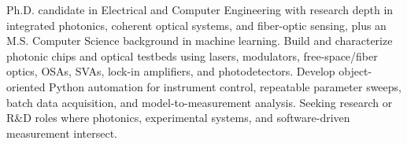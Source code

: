 
\begin{cvparagraph}

{Ph.D. candidate in Electrical and Computer Engineering with research depth in integrated photonics, coherent optical systems, and fiber-optic sensing, plus an M.S. Computer Science background in machine learning. Build and characterize photonic chips and optical testbeds using lasers, modulators, free-space/fiber optics, OSAs, SVAs, lock-in amplifiers, and photodetectors. Develop object-oriented Python automation for instrument control, repeatable parameter sweeps, batch data acquisition, and model-to-measurement analysis. Seeking research or R\&D roles where photonics, experimental systems, and software-driven measurement intersect.}
\vspace{-0.5cm}
\end{cvparagraph}


